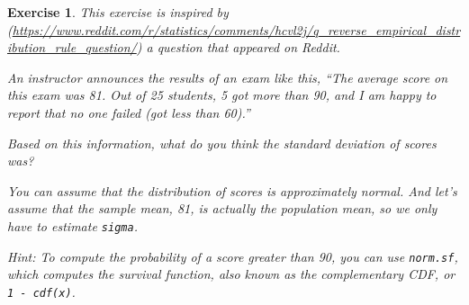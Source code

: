 \documentclass[12pt]{book}
\theoremstyle{exercise}
\newtheorem{exercise}{Exercise}[chapter]
\newcommand{\py}[1]{{\tt #1}}%
\begin{document}
\begin{exercise}
This exercise is inspired by
(\url{https://www.reddit.com/r/statistics/comments/hcvl2j/q_reverse_empirical_distribution_rule_question/}) a
question that appeared on Reddit.

An instructor announces the results of an exam like this, ``The average
score on this exam was 81. Out of 25 students, 5 got more than 90, and I
am happy to report that no one failed (got less than 60).''

Based on this information, what do you think the standard deviation of
scores was?

You can assume that the distribution of scores is approximately normal.
And let's assume that the sample mean, 81, is actually the population
mean, so we only have to estimate \py{sigma}.

Hint: To compute the probability of a score greater than 90, you can use
\py{norm.sf}, which computes the survival function,
also known as the complementary CDF, or
\py{1 - cdf(x)}.

\end{exercise}
\end{document}
